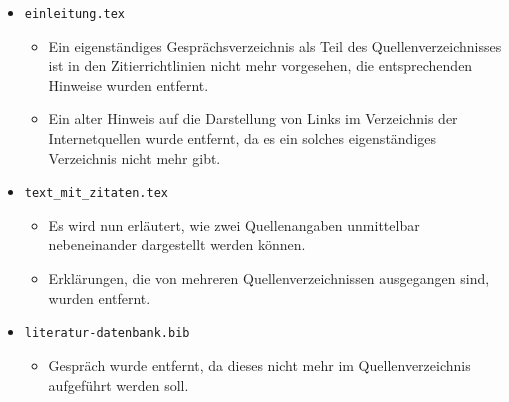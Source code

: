 \begin{itemize}
\item \verb|einleitung.tex|
\begin{itemize}
\item Ein eigenständiges Gesprächsverzeichnis als Teil des Quellenverzeichnisses ist in den Zitierrichtlinien nicht mehr vorgesehen, die entsprechenden Hinweise wurden entfernt.
\item Ein alter Hinweis auf die Darstellung von Links im Verzeichnis der Internetquellen wurde entfernt, da es ein solches eigenständiges Verzeichnis nicht mehr gibt. 
\end{itemize}

\item \verb|text_mit_zitaten.tex|
\begin{itemize}
\item Es wird nun erläutert, wie zwei Quellenangaben unmittelbar nebeneinander dargestellt werden können.
\item Erklärungen, die von mehreren Quellenverzeichnissen ausgegangen sind, wurden entfernt.
\end{itemize}

\item \verb|literatur-datenbank.bib|
\begin{itemize}
\item Gespräch wurde entfernt, da dieses nicht mehr im Quellenverzeichnis aufgeführt werden soll.
\end{itemize}

\end{itemize}
